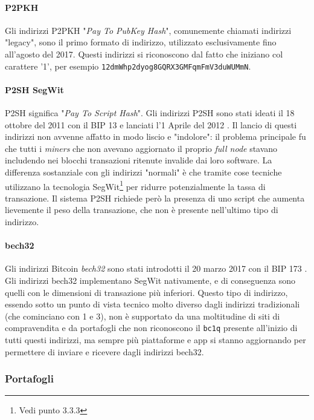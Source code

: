 \documentclass {article}
\begin{document}
\paragraph {P2PKH}

Gli indirizzi P2PKH "\textit{Pay To PubKey Hash}", comunemente chiamati indirizzi "legacy", sono il primo formato di indirizzo, utilizzato esclusivamente fino all'agosto del 2017.
Questi indirizzi si riconoscono dal fatto che iniziano col carattere '1', per esempio \texttt{12dmWhp2dyog8GQRX3GMFqmFmV3duWUMmN}.

\paragraph {P2SH SegWit}

P2SH significa "\textit{Pay To Script Hash}".
Gli indirizzi P2SH sono stati ideati il 18 ottobre del 2011 con il BIP 13 e lanciati l'1 Aprile del 2012 \cite{bip13}\cite{p2sh}.
Il lancio di questi indirizzi non avvenne affatto in modo liscio e "indolore": il problema principale fu che tutti i \textit{miners} che non avevano aggiornato il proprio \textit{full node} stavano includendo nei blocchi transazioni ritenute invalide dai loro software.
La differenza sostanziale con gli indirizzi "normali" è che tramite cose tecniche utilizzano la tecnologia SegWit\footnote{Vedi punto 3.3.3} per ridurre potenzialmente la tassa di transazione.
Il sistema P2SH richiede però la presenza di uno script che aumenta lievemente il peso della transazione, che non è presente nell'ultimo tipo di indirizzo.

\paragraph {bech32}

Gli indirizzi Bitcoin \textit{bech32} sono stati introdotti il 20 marzo 2017 con il BIP 173 \cite{bip173}.
Gli indirizzi bech32 implementano SegWit nativamente, e di conseguenza sono quelli con le dimensioni di transazione più inferiori.
Questo tipo di indirizzo, essendo sotto un punto di vista tecnico molto diverso dagli indirizzi tradizionali (che cominciano con 1 e 3), non è supportato da una moltitudine di siti di compravendita e da portafogli che non riconoscono il \texttt{bc1q} presente all'inizio di tutti questi indirizzi, ma sempre più piattaforme e app si stanno aggiornando per permettere di inviare e ricevere dagli indirizzi bech32.


\subsubsection {Portafogli}
\end{document}
